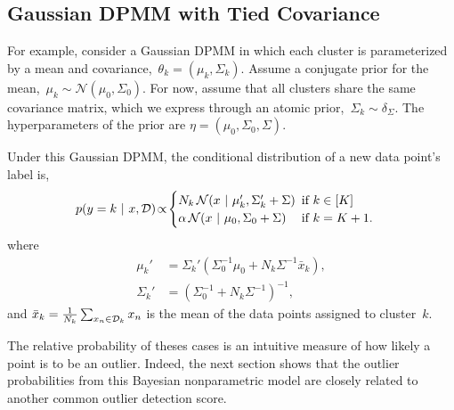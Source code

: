 \subsection{Gaussian DPMM with Tied Covariance}
\label{sec:tied-cov}

For example, consider a Gaussian DPMM in which each cluster is parameterized by a mean and covariance,~${\theta_k = (\mu_k, \Sigma_k)}$.
Assume a conjugate prior for the mean,~$\mu_k \sim \mathcal{N}(\mu_0, \Sigma_0)$.
For now, assume that all clusters share the same covariance matrix, which we express through an atomic prior,~$\Sigma_k \sim \delta_\Sigma$.
The hyperparameters of the prior are $\eta = (\mu_0, \Sigma_0, \Sigma)$.

Under this Gaussian DPMM, the conditional distribution of a new data point's label is,
\begin{align}
    \label{eq:gaussian_dpmm_outlier_unnormalized}
    p(y = k \mid x, \cD)
    &\!\propto\!
    \begin{cases}
    N_k \, \mathcal{N}(x \mid \mu_k', \Sigma_k' + \Sigma) &\!\!\!\text{if } k\in[K] \\
    \alpha \, \mathcal{N}(x \mid \mu_0, \Sigma_0 + \Sigma) &\!\!\!\text{if } k = K+1.
    \end{cases}
\end{align}
where
\begin{align}
    \nonumber \mu_k' &= \Sigma_k' \left(\Sigma_0^{-1} \mu_0 +  N_k \Sigma^{-1} \bar{x}_k\right), \\
    \label{eq:gaussian_tied_postpred}
    \Sigma_k' &= \left( \Sigma_0^{-1} + N_k \Sigma^{-1} \right)^{-1},
\end{align}
and $\bar{x}_k = \tfrac{1}{N_k} \sum_{x_n \in \mathcal{D}_k} x_n$ is the mean of the data points assigned to cluster~$k$.

The relative probability of theses cases is an intuitive measure of how likely a point is to be an outlier.
Indeed, the next section shows that the outlier probabilities from this Bayesian nonparametric model are closely related to another common outlier detection score.
